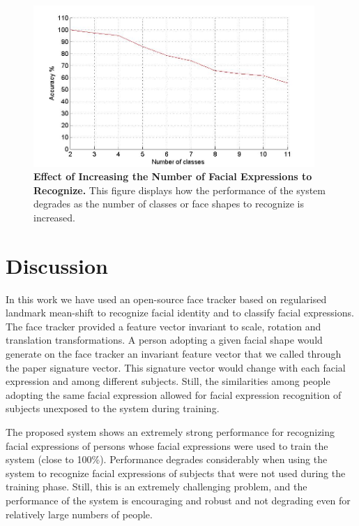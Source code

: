 \documentclass[]{article}
\begin{document}
\begin{figure}[ht]
\begin{center}
\vspace{-3mm}
\includegraphics[width=0.95\textwidth]{figures/50people_increasing_classes.jpg}
\end{center}
\caption{\textbf{Effect of Increasing the Number of Facial Expressions to Recognize.} This figure displays how the 
performance of the system degrades as the number of classes or face shapes to recognize is increased. }
\label{increasingNumberExpressions}
\end{figure}






\section{Discussion}
In this work we have used an open-source face tracker based on regularised landmark mean-shift to recognize facial
identity and to classify facial expressions. The face tracker provided a feature vector invariant to scale, rotation and
translation transformations. A person adopting a given facial shape would generate on the face tracker an invariant
feature vector that we called through the paper signature vector. This signature vector would change with each facial
expression  and among different subjects. Still, the similarities among people adopting the same facial expression 
allowed for facial expression recognition of subjects unexposed to the system during training.


The proposed system shows an extremely strong performance for recognizing facial expressions of persons whose facial
expressions were used to train the system (close to 100\%). Performance degrades considerably when using the system to
recognize facial expressions of subjects that were not used during the training phase. Still, this is an extremely
challenging problem, and the performance of the system is encouraging and robust and not degrading even for relatively
large numbers of people.
\end{document}
